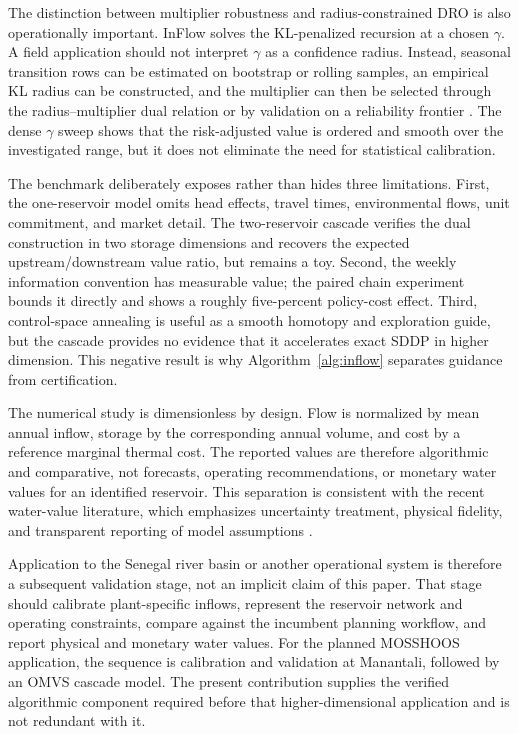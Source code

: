 \documentclass[pdflatex,sn-mathphys-num]{sn-jnl}
\theoremstyle{thmstyleone}
\theoremstyle{thmstyletwo}
\theoremstyle{thmstylethree}
\begin{document}
The distinction between multiplier robustness and radius-constrained DRO is
also operationally important. InFlow solves the KL-penalized recursion at a
chosen $\gamma$. A field application should not interpret $\gamma$ as a
confidence radius. Instead, seasonal transition rows can be estimated on
bootstrap or rolling samples, an empirical KL radius can be constructed, and
the multiplier can then be selected through the radius--multiplier dual
relation or by validation on a reliability frontier \citep{lam2019,duchi2021}.
The dense $\gamma$ sweep shows that the risk-adjusted value is ordered and
smooth over the investigated range, but it does not eliminate the need for
statistical calibration.

The benchmark deliberately exposes rather than hides three limitations.
First, the one-reservoir model omits head effects, travel times, environmental
flows, unit commitment, and market detail. The two-reservoir cascade verifies
the dual construction in two storage dimensions and recovers the expected
upstream/downstream value ratio, but remains a toy. Second, the weekly
information convention has measurable value; the paired chain experiment
bounds it directly and shows a roughly five-percent policy-cost effect.
Third, control-space annealing is useful as a smooth homotopy and exploration
guide, but the cascade provides no evidence that it accelerates exact SDDP in
higher dimension. This negative result is why Algorithm~\ref{alg:inflow}
separates guidance from certification.

The numerical study is dimensionless by design. Flow is normalized by mean
annual inflow, storage by the corresponding annual volume, and cost by a
reference marginal thermal cost. The reported values are therefore algorithmic
and comparative, not forecasts, operating recommendations, or monetary water
values for an identified reservoir. This separation is consistent with the
recent water-value literature, which emphasizes uncertainty treatment,
physical fidelity, and transparent reporting of model assumptions
\citep{pavicevic2026water}.

Application to the Senegal river basin or another operational system is
therefore a subsequent validation stage, not an implicit claim of this
paper. That stage should calibrate plant-specific inflows, represent the
reservoir network and operating constraints, compare against the
incumbent planning workflow, and report physical and monetary water
values. For the planned MOSSHOOS application, the sequence is calibration
and validation at Manantali, followed by an OMVS cascade model. The present
contribution supplies the verified algorithmic component required before
that higher-dimensional application and is not redundant with it.
\end{document}
